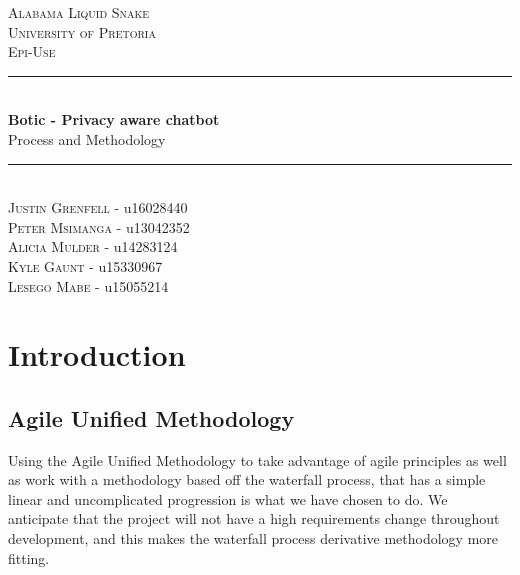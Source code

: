 \documentclass[11pt]{article}
\begin{document}
\renewcommand{\familydefault}{\sfdefault}
\begin{titlepage}
	\newcommand{\HRule}{\rule{\linewidth}{0.5mm}}
	\begin{center}
		            
		\textsc{\LARGE Alabama Liquid Snake}\\[0.8cm]
		\textsc{\Large University of Pretoria}\\[0.5cm]
		\textsc{\large Epi-Use}\\[0.5cm]
		    
		\HRule\\[0.4cm]
		    	
		{\huge\bfseries Botic - Privacy aware chatbot}\\[0.2cm]
		    	
		{\huge Process and Methodology}\\[0.2cm]
		
		\HRule\\[0.5cm]
		
		\textsc{Justin Grenfell} - u16028440 \\[0cm]
		\textsc{Peter Msimanga} - u13042352 \\[0cm]
		\textsc{Alicia Mulder} - u14283124 \\[0cm]
		\textsc{Kyle Gaunt} - u15330967 \\[0cm]
		\textsc{Lesego Mabe} - u15055214 \\[0cm]
		    
	\end{center}
\end{titlepage}
\tableofcontents
\newpage

\section{Introduction}
\subsection{Agile Unified Methodology}


Using the Agile Unified Methodology to take advantage of agile principles as well as work with a methodology based off the
waterfall process, that has a simple linear and uncomplicated progression is what we have chosen to do. We anticipate that
the project will not have a high requirements change throughout development, and this makes the waterfall process derivative
methodology more fitting.
\end{document}
